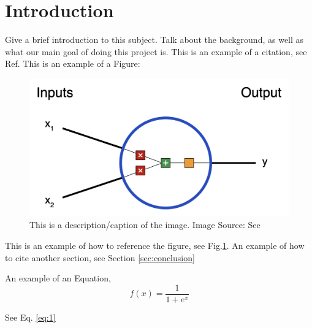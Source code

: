 \section{Introduction} \label{sec:intro}

\indent Give a brief introduction to this subject. Talk about the background, as well as what our main goal
of doing this project is. This is an example of a citation, see Ref.\cite{cyero_phdthesis}
This is an example of a Figure:\\
\begin{figure}[h!]
  \centering
  \includegraphics[scale=0.3]{sections/images/Neuron.png}
  \caption{This is a description/caption of the image. Image Source: See \cite{VZhou_blog_NN_intro}}
  \label{fig:Neuron}
\end{figure}
This is an example of how to reference the figure, see Fig.\ref{fig:Neuron}.
An example of how to cite another section, see Section \ref{sec:conclusion}

An example of an Equation,
\begin{equation}
  f(x)  = \frac{1}{1 + e^{x}}
  \label{eq:1}
\end{equation}

See Eq. \ref{eq:1}
